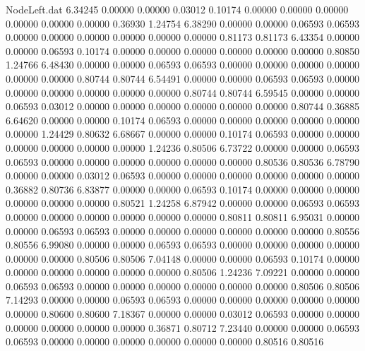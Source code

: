 \begin{filecontents}{NodeLeft.dat}
   6.34245    0.00000    0.00000     0.03012    0.10174    0.00000    0.00000    0.00000    0.00000    0.00000    0.00000    0.36930    1.24754
   6.38290    0.00000    0.00000     0.06593    0.06593    0.00000    0.00000    0.00000    0.00000    0.00000    0.00000    0.81173    0.81173
   6.43354    0.00000    0.00000     0.06593    0.10174    0.00000    0.00000    0.00000    0.00000    0.00000    0.00000    0.80850    1.24766
   6.48430    0.00000    0.00000     0.06593    0.06593    0.00000    0.00000    0.00000    0.00000    0.00000    0.00000    0.80744    0.80744
   6.54491    0.00000    0.00000     0.06593    0.06593    0.00000    0.00000    0.00000    0.00000    0.00000    0.00000    0.80744    0.80744
   6.59545    0.00000    0.00000     0.06593    0.03012    0.00000    0.00000    0.00000    0.00000    0.00000    0.00000    0.80744    0.36885
   6.64620    0.00000    0.00000     0.10174    0.06593    0.00000    0.00000    0.00000    0.00000    0.00000    0.00000    1.24429    0.80632
   6.68667    0.00000    0.00000     0.10174    0.06593    0.00000    0.00000    0.00000    0.00000    0.00000    0.00000    1.24236    0.80506
   6.73722    0.00000    0.00000     0.06593    0.06593    0.00000    0.00000    0.00000    0.00000    0.00000    0.00000    0.80536    0.80536
   6.78790    0.00000    0.00000     0.03012    0.06593    0.00000    0.00000    0.00000    0.00000    0.00000    0.00000    0.36882    0.80736
   6.83877    0.00000    0.00000     0.06593    0.10174    0.00000    0.00000    0.00000    0.00000    0.00000    0.00000    0.80521    1.24258
   6.87942    0.00000    0.00000     0.06593    0.06593    0.00000    0.00000    0.00000    0.00000    0.00000    0.00000    0.80811    0.80811
   6.95031    0.00000    0.00000     0.06593    0.06593    0.00000    0.00000    0.00000    0.00000    0.00000    0.00000    0.80556    0.80556
   6.99080    0.00000    0.00000     0.06593    0.06593    0.00000    0.00000    0.00000    0.00000    0.00000    0.00000    0.80506    0.80506
   7.04148    0.00000    0.00000     0.06593    0.10174    0.00000    0.00000    0.00000    0.00000    0.00000    0.00000    0.80506    1.24236
   7.09221    0.00000    0.00000     0.06593    0.06593    0.00000    0.00000    0.00000    0.00000    0.00000    0.00000    0.80506    0.80506
   7.14293    0.00000    0.00000     0.06593    0.06593    0.00000    0.00000    0.00000    0.00000    0.00000    0.00000    0.80600    0.80600
   7.18367    0.00000    0.00000     0.03012    0.06593    0.00000    0.00000    0.00000    0.00000    0.00000    0.00000    0.36871    0.80712
   7.23440    0.00000    0.00000     0.06593    0.06593    0.00000    0.00000    0.00000    0.00000    0.00000    0.00000    0.80516    0.80516

\end{filecontents}

